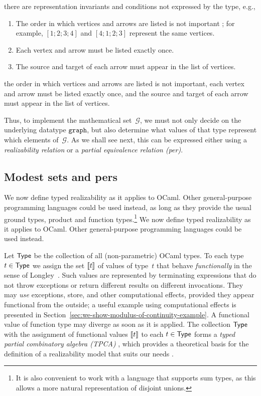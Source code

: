 there are representation invariants and conditions not expressed by the type, e.g.,
%
\iflong
\begin{enumerate}
\item The order in which vertices and arrows are listed is not
  important%
; for example, $[1;2;3;4]$ and $[4;1;2;3]$ represent the same vertices.
\item Each vertex and arrow must be listed exactly once.
\item The source and target of each arrow must appear in the list of vertices.
\end{enumerate}
\else %
the order in which vertices and arrows are listed is not
important, each vertex and arrow must be listed exactly once, and
the source and target of each arrow must appear in the list of vertices.
\fi %

%
Thus, to implement the mathematical set~$\mathcal{G}$, we must not
only decide on the underlying datatype $\mathtt{graph}$, but also
determine what values of that type represent which elements
of~$\mathcal{G}$. As we shall see next, this can be expressed either
using a \emph{realizability relation} or a \emph{partial equivalence
  relation (per)}.


\subsection{Modest sets and pers}
\label{sec:modest-sets-pers}

\iflong
We now define typed realizability as it
applies to OCaml. Other general-purpose programming languages could be
used instead, as long as they provide the usual ground types, product
and function types.\footnote{It is also convenient to work with a
language that supports sum types, as this allows a more natural
representation of disjoint unions.}
\else
We now define typed realizability as it
applies to OCaml. Other general-purpose programming languages could be
used instead.
\fi %

Let $\mathsf{Type}$ be the collection of all (non-parametric) OCaml types. To
each type $t \in \mathsf{Type}$ we assign the set $[\![t]\!]$ of values of
type~$t$ that behave \emph{functionally} in the sense of
Longley~\cite{longley99when}. Such values are represented by
terminating expressions that do not throw exceptions or return
different results on different invocations. They may \emph{use}
exceptions, store, and other computational effects, provided they
appear functional from the outside; a useful example using
computational effects is presented in
Section~\ref{sec:we-show-modulus-of-continuity-example}. A functional
value of function type may diverge as soon as it is applied. The
collection $\mathsf{Type}$ with the assignment of functional values
$[\![t]\!]$ to each $t \in \mathsf{Type}$ forms a \emph{typed partial
  combinatory algebra (TPCA)}%
\iflong
, which provides a theoretical basis for
the definition of a realizability model that suits our needs%
\fi%
.

